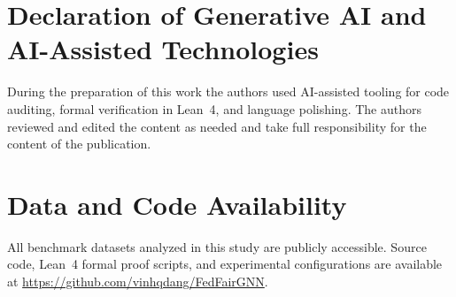 \documentclass[preprint,12pt]{elsarticle}
\begin{document}








\section*{Declaration of Generative AI and AI-Assisted Technologies}
During the preparation of this work the authors used AI-assisted tooling for code auditing, formal verification in Lean~4, and language polishing. The authors reviewed and edited the content as needed and take full responsibility for the content of the publication.

\section*{Data and Code Availability}
All benchmark datasets analyzed in this study are publicly accessible. Source code, Lean~4 formal proof scripts, and experimental configurations are available at \url{https://github.com/vinhqdang/FedFairGNN}.



\end{document}

